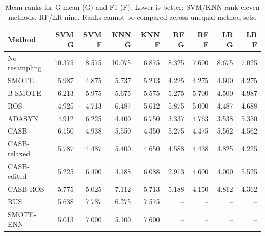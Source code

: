 \begin{table}[pos=!htbp]
\centering\small
\caption{Mean ranks for G-mean (G) and F1 (F). Lower is better; SVM/KNN rank eleven methods, RF/LR nine. Ranks cannot be compared across unequal method sets.}\label{tab:ranks}
\begin{tabular}{lrrrrrrrr}\toprule
Method & SVM G & SVM F & KNN G & KNN F & RF G & RF F & LR G & LR F \\
\midrule
No resampling & 10.375 & 8.575 & 10.075 & 6.875 & 8.325 & 7.600 & 8.675 & 7.025 \\
SMOTE & 5.987 & 4.875 & 5.737 & 5.213 & 4.225 & 4.275 & 4.600 & 4.275 \\
B-SMOTE & 6.213 & 5.975 & 5.675 & 5.575 & 5.275 & 5.700 & 4.500 & 4.987 \\
ROS & 4.925 & 4.713 & 6.487 & 5.612 & 5.875 & 5.000 & 4.487 & 4.688 \\
ADASYN & 4.912 & 6.225 & 4.400 & 6.750 & 3.337 & 4.763 & 3.538 & 5.350 \\
CASB & 6.150 & 4.938 & 5.550 & 4.350 & 5.275 & 4.475 & 5.562 & 4.562 \\
CASB-relaxed & 5.787 & 4.487 & 5.400 & 4.650 & 4.588 & 4.438 & 4.825 & 4.225 \\
CASB-edited & 5.225 & 6.400 & 4.188 & 6.088 & 2.913 & 4.600 & 4.000 & 5.525 \\
CASB-ROS & 5.775 & 5.025 & 7.112 & 5.713 & 5.188 & 4.150 & 4.812 & 4.362 \\
RUS & 5.638 & 7.787 & 6.275 & 7.575 & -- & -- & -- & -- \\
SMOTE-ENN & 5.013 & 7.000 & 5.100 & 7.600 & -- & -- & -- & -- \\
\bottomrule\end{tabular}
\end{table}
